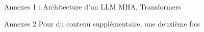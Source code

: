 \begin{frame}{Annexes 1 : Architecture d'un LLM}
    MHA, Transformers
    
\end{frame}

\begin{frame}{Annexes 2}
    Pour du contenu supplémentaire, une deuxième fois
    
\end{frame}